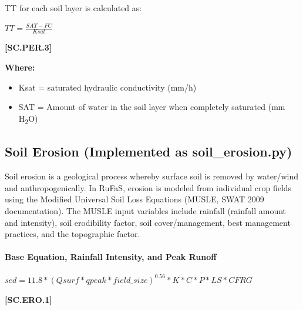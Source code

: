 TT for each soil layer is calculated as:
 \vspace{0.5cm}

    \begin{center}
 \(TT=\frac{SAT-FC}{Ksat}	\)
    \end{center}
        \vspace{0.5cm} 
    
            {\raggedleft \textbf{[SC.PER.3]}\par}
            \vspace{0.5cm}

        \textbf{Where:}
            
        \begin{itemize}
            \item Ksat	=	saturated hydraulic conductivity (mm/h)
            \item 	SAT     =   Amount of water in the soil layer when completely saturated (mm H\textsubscript{2}O)
        \end{itemize}
\vspace{0.5cm}

\subsection{Soil Erosion (Implemented as  soil\_erosion.py)}
\vspace{0.2cm}

Soil erosion is a geological process whereby surface soil is removed by water/wind and  anthropogenically. In RuFaS, erosion is modeled from individual crop fields using the Modified Universal Soil Loss Equations (MUSLE, SWAT 2009 documentation). The MUSLE input variables include rainfall (rainfall amount and intensity), soil erodibility factor, soil cover/management, best management practices, and the topographic factor.
 \vspace{0.5cm}

 \paragraph{Base Equation, Rainfall Intensity, and Peak Runoff}

    \begin{center}
 \(sed=11.8 *( Qsurf*qpeak*field\_size)^{0.56} * K * C * P * LS * CFRG\)
    \end{center}
        \vspace{0.5cm} 
    
            {\raggedleft \textbf{[SC.ERO.1]}\par}
            \vspace{0.5cm}

